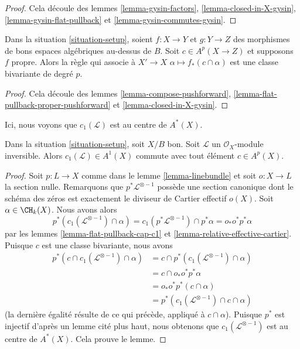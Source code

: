 \begin{proof}
Cela découle des lemmes \ref{lemma-gysin-factors},
\ref{lemma-closed-in-X-gysin}, \ref{lemma-gysin-flat-pullback} et
\ref{lemma-gysin-commutes-gysin}.
\end{proof}

\begin{lemma}
\label{lemma-push-proper-bivariant}
Dans la situation \ref{situation-setup}, soient $f : X \to Y$ et $g : Y \to Z$
des morphismes de bons espaces algébriques au-dessus de $B$. Soit $c \in A^p(X \to Z)$
et supposons $f$ propre. Alors la règle qui associe à $X' \to X$
$\alpha \longmapsto f_*(c \cap \alpha)$ est une classe bivariante de degré
$p$.
\end{lemma}

\begin{proof}
Cela découle des lemmes \ref{lemma-compose-pushforward},
\ref{lemma-flat-pullback-proper-pushforward} et \ref{lemma-closed-in-X-gysin}.
\end{proof}

\noindent
Ici, nous voyons que $c_1(\mathcal{L})$ est au centre de $A^*(X)$.

\begin{lemma}
\label{lemma-c1-center}
Dans la situation \ref{situation-setup}, soit $X/B$ bon. Soit
$\mathcal{L}$ un $\mathcal{O}_X$-module inversible. Alors $c_1(\mathcal{L})
\in A^1(X)$ commute avec tout élément $c \in A^p(X)$.
\end{lemma}

\begin{proof}
Soit $p : L \to X$ comme dans le lemme \ref{lemma-linebundle} et soit $o : X
\to L$ la section nulle. Remarquons que $p^*\mathcal{L}^{\otimes -1}$ possède une
section canonique dont le schéma des zéros est exactement le diviseur de
Cartier effectif $o(X)$. Soit $\alpha \in \CH_k(X)$. Nous avons alors
$$
p^*(c_1(\mathcal{L}^{\otimes -1}) \cap \alpha) =
c_1(p^*\mathcal{L}^{\otimes -1}) \cap p^*\alpha =
o_* o^* p^*\alpha
$$
par les lemmes \ref{lemma-flat-pullback-cap-c1} et
\ref{lemma-relative-effective-cartier}. Puisque $c$ est une classe bivariante,
nous avons
\begin{align*}
p^*(c \cap c_1(\mathcal{L}^{\otimes -1}) \cap \alpha)
& =
c \cap p^*(c_1(\mathcal{L}^{\otimes -1}) \cap \alpha) \\
& =
c \cap o_* o^* p^*\alpha \\
& =
o_* o^* p^*(c \cap \alpha) \\
& =
p^*(c_1(\mathcal{L}^{\otimes -1}) \cap c \cap \alpha)
\end{align*}
(la dernière égalité résulte de ce qui précède, appliqué à $c \cap \alpha$). Puisque
$p^*$ est injectif d'après un lemme cité plus haut, nous obtenons que
$c_1(\mathcal{L}^{\otimes -1})$ est au centre de $A^*(X)$. Cela prouve le
lemme.
\end{proof}

